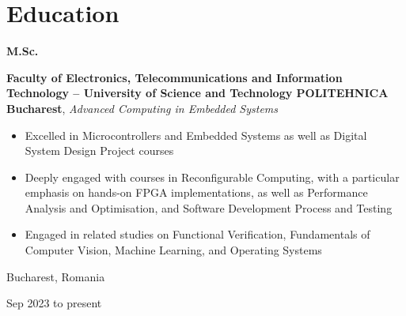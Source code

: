 \documentclass[10pt, letterpaper]{article}
\newenvironment{highlights}{
    \begin{itemize}[
        topsep=0.1 cm,
        parsep=0.1 cm,
        partopsep=0pt,
        itemsep=0pt,
        leftmargin=0 cm + 10pt
    ]
}{
    \end{itemize}
} %
\newenvironment{threecolentry}[3][]{
    \onecolentry
    \def\thirdColumn{#3}
    \setcolumnwidth{1 cm, \fill, 3.5 cm}
    \begin{paracol}{3}
    {\raggedright #2} \switchcolumn
}{
    \switchcolumn \raggedleft \thirdColumn
    \end{paracol}
    \endonecolentry
} %
\begin{document}
    
    \section{Education}



        
        \begin{threecolentry}{\textbf{M.Sc.}}{
            Bucharest, Romania

        Sep 2023 to present
        }
            \textbf{Faculty of Electronics, Telecommunications and Information Technology – University of Science and Technology POLITEHNICA Bucharest}, \textit{Advanced Computing in Embedded Systems}
            \begin{highlights}
                \item Excelled in Microcontrollers and Embedded Systems as well as Digital System Design Project courses
                \item Deeply engaged with courses in Reconfigurable Computing, with a particular emphasis on hands-on FPGA implementations, as well as Performance Analysis and Optimisation, and Software Development Process and Testing
                \item Engaged in related studies on Functional Verification, Fundamentals of Computer Vision, Machine Learning, and Operating Systems
            \end{highlights}
        \end{threecolentry}

        \vspace{0.2 cm}
\end{document}

